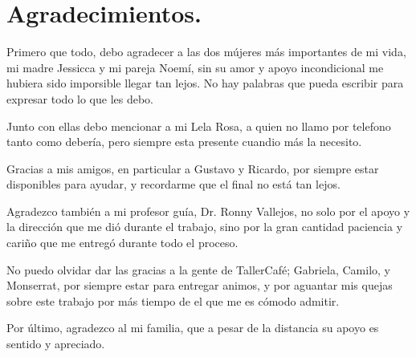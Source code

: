 \chapter*{Agradecimientos.}

Primero que todo, debo agradecer a las dos m\'ujeres m\'as importantes de mi vida, mi madre Jessicca y mi pareja Noem\'i, sin su amor y apoyo incondicional me hubiera sido imporsible llegar tan lejos. No hay palabras que pueda escribir para expresar todo lo que les debo.

Junto con ellas debo mencionar a mi Lela Rosa, a quien no llamo por telefono tanto como deber\'ia, pero siempre esta presente cuandio m\'as la necesito.

Gracias a mis amigos, en particular a Gustavo y Ricardo, por siempre estar disponibles para ayudar, y recordarme que el final no está tan lejos. 

Agradezco tambi\'en a mi profesor gu\'ia, Dr. Ronny Vallejos, no solo por el apoyo y la direcci\'on que me dió durante el trabajo, sino por la gran cantidad paciencia y cariño que me entreg\'o durante todo el proceso. 

No puedo olvidar dar las gracias a la gente de TallerCaf\'e; Gabriela, Camilo, y Monserrat, por siempre estar para entregar animos, y por aguantar mis quejas sobre este trabajo por m\'as tiempo de el que me es c\'omodo admitir.

Por \'ultimo, agradezco al mi familia, que a pesar de la distancia su apoyo es sentido y apreciado.